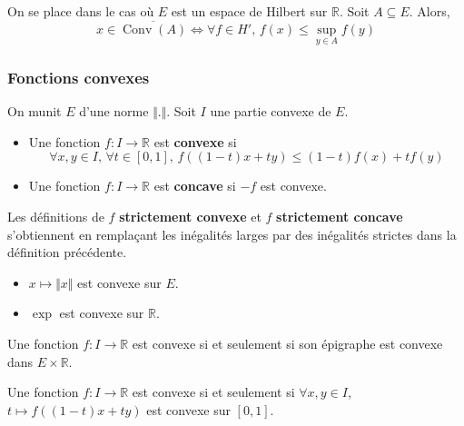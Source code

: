   \begin{corollary}
    On se place dans le cas où $E$ est un espace de Hilbert sur $\mathbb{R}$. Soit $A \subseteq E$. Alors,
    \[ x \in \overline{\operatorname{Conv}(A)} \iff \forall f \in H', \, f(x) \leq \sup_{y \in A} f(y) \]
  \end{corollary}

  \subsubsection{Fonctions convexes}

  On munit $E$ d'une norme $\Vert . \Vert$. Soit $I$ une partie convexe de $E$.


  \begin{definition}
    \begin{itemize}
      \item Une fonction $f : I \rightarrow \mathbb{R}$ est \textbf{convexe} si
      \[ \forall x, y \in I, \, \forall t \in [0,1], \, f((1-t)x + ty) \leq (1-t)f(x) + tf(y) \]
      \item Une fonction $f : I \rightarrow \mathbb{R}$ est \textbf{concave} si $-f$ est convexe.
    \end{itemize}
  \end{definition}

  \begin{remark}
    Les définitions de $f$ \textbf{strictement convexe} et $f$ \textbf{strictement concave} s'obtiennent en remplaçant les inégalités larges par des inégalités strictes dans la définition précédente.
  \end{remark}

  \begin{example}
    \begin{itemize}
      \item $x \mapsto \Vert x \Vert$ est convexe sur $E$.
      \item $\exp$ est convexe sur $\mathbb{R}$.
    \end{itemize}
  \end{example}

  \begin{proposition}
    Une fonction $f : I \rightarrow \mathbb{R}$ est convexe si et seulement si son épigraphe est convexe dans $E \times \mathbb{R}$.
  \end{proposition}

  \begin{theorem}
    Une fonction $f : I \rightarrow \mathbb{R}$ est convexe si et seulement si $\forall x, y \in I$, $t \mapsto f((1-t)x + ty)$ est convexe sur $[0,1]$.
  \end{theorem}

